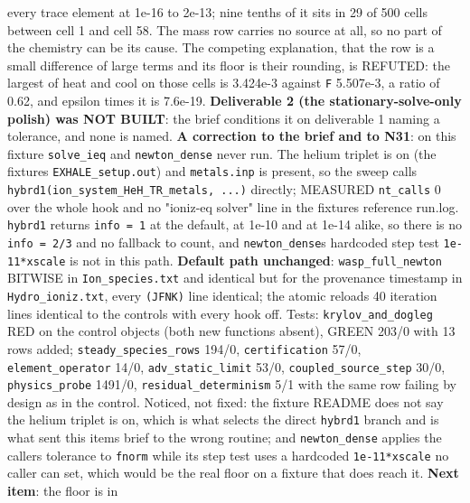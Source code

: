 \documentclass[english,a4paper]{my_memo}
\begin{document}
\begin{itemize}
  every trace element at 1e-16 to 2e-13; nine tenths of it sits in 29 of
  500 cells between cell 1 and cell 58. The mass row carries no source at
  all, so no part of the chemistry can be its cause. The competing
  explanation, that the row is a small difference of large terms and its
  floor is their rounding, is REFUTED: the largest of heat and cool on
  those cells is 3.424e-3 against \texttt{\textbar{}\textbar{}F\textbar{}\textbar{}} 5.507e-3, a ratio of 0.62, and
  epsilon times it is 7.6e-19. \textbf{Deliverable 2 (the stationary-solve-only
  polish) was NOT BUILT}: the brief conditions it on deliverable 1
  naming a tolerance, and none is named. \textbf{A correction to the brief and
  to N31}: on this fixture \texttt{solve\_ieq} and \texttt{newton\_dense} never run.
  The helium triplet is on (the fixture\textquotesingle s \texttt{EXHALE\_setup.out}) and
  \texttt{metals.inp} is present, so the sweep calls
  \texttt{hybrd1(ion\_system\_HeH\_TR\_metals,\ ...)} directly; MEASURED \texttt{nt\_calls} 0
  over the whole hook and no "ioniz-eq solver" line in the fixture\textquotesingle s
  reference run.log. \texttt{hybrd1} returns \texttt{info\ =\ 1} at the default, at 1e-10
  and at 1e-14 alike, so there is no \texttt{info\ =\ 2/3} and no fallback to
  count, and \texttt{newton\_dense}\textquotesingle s hardcoded step test \texttt{1e-11*xscale} is not in
  this path. \textbf{Default path unchanged}: \texttt{wasp\_full\_newton} BITWISE in
  \texttt{Ion\_species.txt} and identical but for the provenance timestamp in
  \texttt{Hydro\_ioniz.txt}, every \texttt{(JFNK)} line identical; the atomic reload\textquotesingle s 40
  iteration lines identical to the control\textquotesingle s with every hook off. Tests:
  \texttt{krylov\_and\_dogleg} RED on the control objects (both new functions
  absent), GREEN 203/0 with 13 rows added; \texttt{steady\_species\_rows} 194/0,
  \texttt{certification} 57/0, \texttt{element\_operator} 14/0, \texttt{adv\_static\_limit} 53/0,
  \texttt{coupled\_source\_step} 30/0, \texttt{physics\_probe} 1491/0,
  \texttt{residual\_determinism} 5/1 with the same row failing by design as in the
  control. Noticed, not fixed: the fixture README does not say the helium
  triplet is on, which is what selects the direct \texttt{hybrd1} branch and is
  what sent this item\textquotesingle s brief to the wrong routine; and \texttt{newton\_dense}
  applies the caller\textquotesingle s tolerance to \texttt{fnorm} while its step test uses a
  hardcoded \texttt{1e-11*xscale} no caller can set, which would be the real
  floor on a fixture that does reach it. \textbf{Next item}: the floor is in

\end{itemize}
\end{document}
